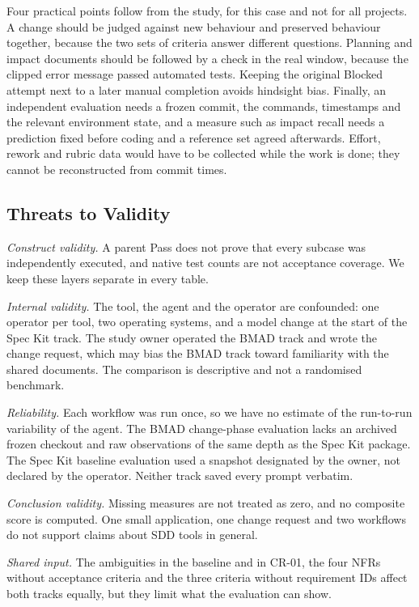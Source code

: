 \documentclass[conference]{IEEEtran}
\begin{document}
Four practical points follow from the study, for this case and not for
all projects. A change should be judged against new behaviour and
preserved behaviour together, because the two sets of criteria answer
different questions. Planning and impact documents should be followed by
a check in the real window, because the clipped error message passed
automated tests. Keeping the original Blocked attempt next to a later
manual completion avoids hindsight bias. Finally, an independent
evaluation needs a frozen commit, the commands, timestamps and the
relevant environment state, and a measure such as impact recall needs a
prediction fixed before coding and a reference set agreed afterwards.
Effort, rework and rubric data would have to be collected while the work
is done; they cannot be reconstructed from commit times.

\subsection{Threats to Validity}\label{threats-to-validity}

\emph{Construct validity.} A parent Pass does not prove that every
subcase was independently executed, and native test counts are not
acceptance coverage. We keep these layers separate in every table.

\emph{Internal validity.} The tool, the agent and the operator are
confounded: one operator per tool, two operating systems, and a model
change at the start of the Spec Kit track. The study owner operated the
BMAD track and wrote the change request, which may bias the BMAD track
toward familiarity with the shared documents. The comparison is
descriptive and not a randomised benchmark.

\emph{Reliability.} Each workflow was run once, so we have no estimate
of the run-to-run variability of the agent. The BMAD change-phase
evaluation lacks an archived frozen checkout and raw observations of the
same depth as the Spec Kit package. The Spec Kit baseline evaluation
used a snapshot designated by the owner, not declared by the operator.
Neither track saved every prompt verbatim.

\emph{Conclusion validity.} Missing measures are not treated as zero,
and no composite score is computed. One small application, one change
request and two workflows do not support claims about SDD tools in
general.

\emph{Shared input.} The ambiguities in the baseline and in CR-01, the
four NFRs without acceptance criteria and the three criteria without
requirement IDs affect both tracks equally, but they limit what the
evaluation can show.
\end{document}
